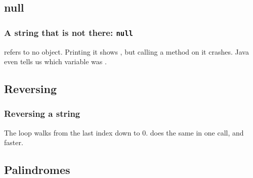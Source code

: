 \documentclass[aspectratio=169,10pt,compress]{beamer}
\begin{document}
\subsection[Null]{null}




\begin{frame}[t,fragile] \frametitle{A string that is not there: \texttt{null}}

  \small {} refers to no object. 
  Printing it shows , but calling a method on it crashes.
  Java even tells us which variable was .
\end{frame}







\subsection[Reverse]{Reversing}




\begin{frame}[t,fragile] \frametitle{Reversing a string}

  \vspace{0.3em}
  \small The loop walks from the last index down to 0. 
   does the same in one call, and faster.
\end{frame}



\subsection[Palindrome]{Palindromes}
\end{document}
